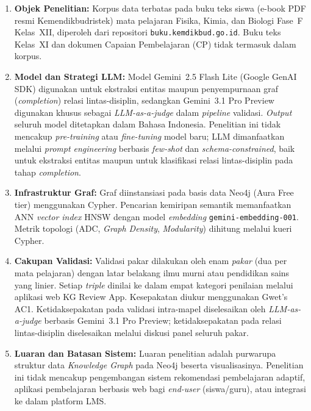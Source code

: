 \documentclass[main]{subfiles}
\begin{document}
\begin{enumerate}
  \item \textbf{Objek Penelitian:} Korpus data terbatas pada buku teks siswa
        (e-book PDF resmi Kemendikbudristek) mata pelajaran Fisika, Kimia, dan
        Biologi Fase~F Kelas~XII, diperoleh dari repositori
        \texttt{buku.kemdikbud.go.id}. Buku teks Kelas~XI dan dokumen
        Capaian Pembelajaran (CP) tidak termasuk dalam korpus.

  \item \textbf{Model dan Strategi LLM:} Model Gemini~2.5 Flash Lite
        (Google GenAI SDK) digunakan untuk ekstraksi entitas maupun
        penyempurnaan graf (\textit{completion}) relasi lintas-disiplin, sedangkan
        Gemini~3.1 Pro Preview digunakan khusus sebagai \textit{LLM-as-a-judge}
        dalam \textit{pipeline} validasi.
        \textit{Output} seluruh model ditetapkan dalam Bahasa Indonesia.
        Penelitian ini tidak mencakup \textit{pre-training} atau
        \textit{fine-tuning} model baru; LLM dimanfaatkan melalui
        \textit{prompt engineering} berbasis \textit{few-shot} dan
        \textit{schema-constrained}, baik untuk ekstraksi entitas maupun untuk
        klasifikasi relasi lintas-disiplin pada tahap \textit{completion}.

  \item \textbf{Infrastruktur Graf:} Graf diinstansiasi pada basis data Neo4j
        (Aura Free tier) menggunakan Cypher. Pencarian kemiripan semantik
        memanfaatkan ANN \textit{vector index} HNSW dengan model
        \textit{embedding} \texttt{gemini-embedding-001}. Metrik topologi (ADC,
        \textit{Graph Density}, \textit{Modularity}) dihitung melalui kueri
        Cypher.

  \item \textbf{Cakupan Validasi:} Validasi pakar dilakukan oleh enam
        \textit{pakar} (dua per mata pelajaran) dengan latar belakang ilmu
        murni atau pendidikan sains yang linier. Setiap \textit{triple} dinilai
        ke dalam empat kategori penilaian melalui aplikasi web KG Review App. Kesepakatan
        diukur menggunakan Gwet's AC1. Ketidaksepakatan pada validasi
        intra-mapel diselesaikan oleh \textit{LLM-as-a-judge} berbasis
        Gemini~3.1 Pro Preview; ketidaksepakatan pada relasi lintas-disiplin
        diselesaikan melalui diskusi panel seluruh pakar.

  \item \textbf{Luaran dan Batasan Sistem:} Luaran penelitian adalah purwarupa
        struktur data \textit{Knowledge Graph} pada Neo4j beserta visualisasinya.
        Penelitian ini tidak mencakup pengembangan sistem rekomendasi pembelajaran
        adaptif, aplikasi pembelajaran berbasis web bagi \textit{end-user}
        (siswa/guru), atau integrasi ke dalam platform LMS.


\end{enumerate}
\end{document}
